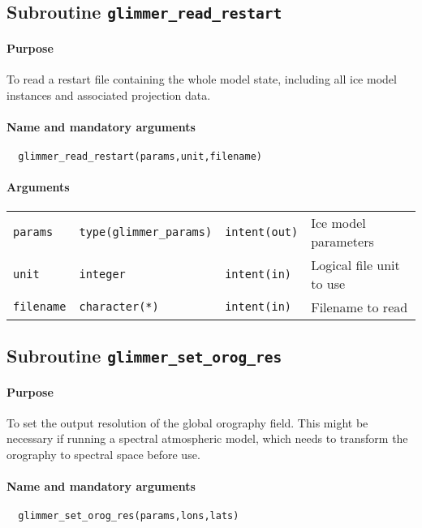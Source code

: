 \documentclass[11pt]{article}
\begin{document}
\subsection{Subroutine \texttt{glimmer\_read\_restart}}
%
\paragraph{Purpose}
%
To read a restart file containing the whole model state, including all ice
model instances and associated projection data.
%
\paragraph{Name and mandatory arguments}
%
\begin{verbatim}
  glimmer_read_restart(params,unit,filename)
\end{verbatim}
%
\paragraph{Arguments}
%
\begin{center}
\begin{tabular}{llll}
\texttt{params} & \texttt{type(glimmer\_params)} & \texttt{intent(out)} &
Ice model parameters \\
\texttt{unit} & \texttt{integer} & \texttt{intent(in)} & Logical file unit to
use \\
\texttt{filename} & \texttt{character(*)} & \texttt{intent(in)} & Filename to
read \\
\end{tabular}
\end{center}
%
\subsection{Subroutine \texttt{glimmer\_set\_orog\_res}}
%
\paragraph{Purpose}
%
To set the output resolution of the global orography field. This might be necessary
if running a spectral atmospheric model, which needs to transform the
orography to spectral space before use.
%
\paragraph{Name and mandatory arguments}
%
\begin{verbatim}
  glimmer_set_orog_res(params,lons,lats)
\end{verbatim}
\end{document}
